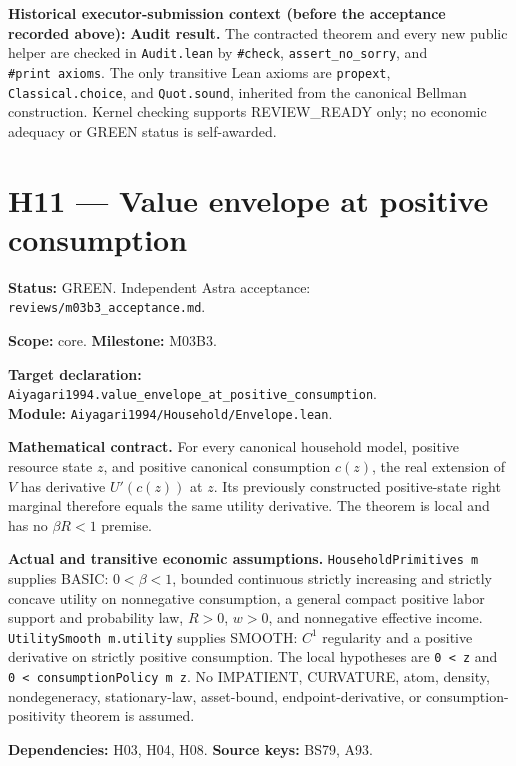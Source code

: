\documentclass[
  11pt,
]{article}
\let\LedgerOriginalTexttt\texttt
\renewcommand{\texttt}[1]{{\small\LedgerOriginalTexttt{#1}}}
\begin{document}
\textbf{Historical executor-submission context (before the acceptance
recorded above):} \textbf{Audit result.} The contracted theorem and
every new public helper are checked in \texttt{Audit.lean} by
\texttt{\#check}, \texttt{assert\_no\_sorry}, and
\texttt{\#print\ axioms}. The only transitive Lean axioms are
\texttt{propext}, \texttt{Classical.choice}, and \texttt{Quot.sound},
inherited from the canonical Bellman construction. Kernel checking
supports REVIEW\_READY only; no economic adequacy or GREEN status is
self-awarded.

\section{H11 --- Value envelope at positive
consumption}\label{h11-value-envelope-at-positive-consumption}

\textbf{Status:} GREEN. Independent Astra acceptance:
\texttt{reviews/m03b3\_acceptance.md}.

\textbf{Scope:} core. \textbf{Milestone:} M03B3.

\textbf{Target declaration:}
\texttt{Aiyagari1994.value\_envelope\_at\_positive\_consumption}.\\
\textbf{Module:} \texttt{Aiyagari1994/Household/Envelope.lean}.

\textbf{Mathematical contract.} For every canonical household model,
positive resource state \(z\), and positive canonical consumption
\(c(z)\), the real extension of \(V\) has derivative \(U'(c(z))\) at
\(z\). Its previously constructed positive-state right marginal
therefore equals the same utility derivative. The theorem is local and
has no \(\beta R<1\) premise.

\textbf{Actual and transitive economic assumptions.}
\texttt{HouseholdPrimitives\ m} supplies BASIC: \(0<\beta<1\), bounded
continuous strictly increasing and strictly concave utility on
nonnegative consumption, a general compact positive labor support and
probability law, \(R>0\), \(w>0\), and nonnegative effective income.
\texttt{UtilitySmooth\ m.utility} supplies SMOOTH: \(C^1\) regularity
and a positive derivative on strictly positive consumption. The local
hypotheses are \texttt{0\ \textless{}\ z} and
\texttt{0\ \textless{}\ consumptionPolicy\ m\ z}. No IMPATIENT,
CURVATURE, atom, density, nondegeneracy, stationary-law, asset-bound,
endpoint-derivative, or consumption-positivity theorem is assumed.

\textbf{Dependencies:} H03, H04, H08. \textbf{Source keys:} BS79, A93.
\end{document}
